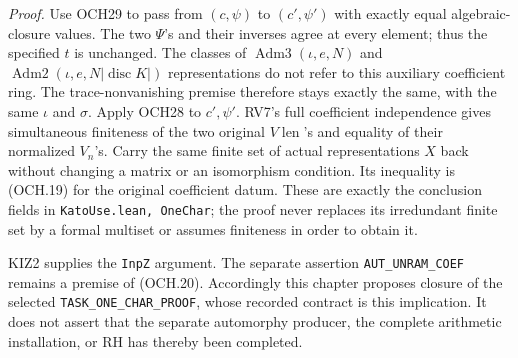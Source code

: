 \emph{Proof.}
Use OCH29 to pass from \((c,\psi)\) to
\((c',\psi')\) with exactly equal algebraic-closure values.
The two \(\Psi\)'s and their inverses agree at every element;
thus the specified \(t\) is unchanged.  The classes of
\(\operatorname{Adm3}(\iota,e,N)\) and
\(\operatorname{Adm2}(\iota,e,N|\operatorname{disc}K|)\)
representations do not refer to this auxiliary coefficient ring.
The trace-nonvanishing premise therefore stays exactly the same,
with the same \(\iota\) and \(\sigma\).
Apply OCH28 to \(c',\psi'\).  RV7's full coefficient
independence gives simultaneous finiteness of the two original
\(V\!\operatorname{len}\)'s and equality of their normalized
\(V_n\)'s.  Carry the same finite set of actual representations
\(X\) back without changing a matrix or an isomorphism condition.
Its inequality is (OCH.19) for the original coefficient datum.
These are exactly the conclusion fields in
\texttt{KatoUse.lean, OneChar}; the proof never replaces its
irredundant finite set by a formal multiset or assumes finiteness
in order to obtain it.

KIZ2 supplies the \texttt{InpZ} argument.  The separate assertion
\texttt{AUT\_UNRAM\_COEF} remains a premise of (OCH.20).
Accordingly this chapter proposes closure of the selected
\texttt{TASK\_ONE\_CHAR\_PROOF}, whose recorded contract is
this implication.  It does not assert that the separate automorphy
producer, the complete arithmetic installation, or RH has thereby
been completed.

